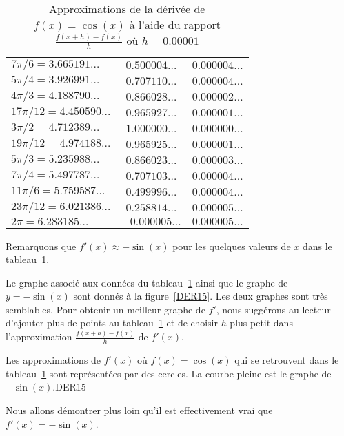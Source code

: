 {\begin{table}
{\begin{center}
\begin{tabular}{l|c|c}
$7\pi/6 = 3.665191\ldots$ & $0.500004\ldots$ & $0.000004\ldots$ \\ 
$5\pi/4 = 3.926991\ldots$ & $0.707110\ldots$ & $0.000004\ldots$ \\ 
$4\pi/3 = 4.188790\ldots$ & $0.866028\ldots$ & $0.000002\ldots$ \\ 
$17\pi/12 = 4.450590\ldots$ & $0.965927\ldots$ & $0.000001\ldots$ \\ 
$3\pi/2 = 4.712389\ldots$ & $1.000000\ldots$ & $0.000000\ldots$ \\ 
$19\pi/12 = 4.974188\ldots$ & $0.965925\ldots$ & $0.000001\ldots$ \\ 
$5\pi/3 = 5.235988\ldots$ & $0.866023\ldots$ & $0.000003\ldots$ \\ 
$7\pi/4 = 5.497787\ldots$ & $0.707103\ldots$ & $0.000004\ldots$ \\ 
$11\pi/6 = 5.759587\ldots$ & $0.499996\ldots$ & $0.000004\ldots$ \\ 
$23\pi/12 = 6.021386\ldots$ & $0.258814\ldots$ & $0.000005\ldots$ \\ 
$2\pi = 6.283185\ldots$ & $-0.000005\ldots$ & $0.000005\ldots$ \\ 
\cline{1-3}
\end{tabular}
\end{center}
}
\caption[Approximations de la dérivée de $f(x) = \cos(x)$ à partir de
la définition de la dérivées.]{Approximations de la dérivée de $f(x) =
\cos(x)$ \`a l'aide du rapport $\displaystyle \frac{f(x+h)-f(x)}{h}$
où $h = 0.00001$ \label{TAB_COS_P}}
\end{table}

Remarquons que $f'(x) \approx -\sin(x)$ pour les quelques valeurs de $x$
dans le tableau~\ref{TAB_COS_P}.

Le graphe associé aux données du tableau~\ref{TAB_COS_P} ainsi que le
graphe de $y=-\sin(x)$ sont donnés à la figure~\ref{DER15}.  Les deux
graphes sont très semblables.  Pour obtenir un meilleur graphe de $f'$,
nous suggérons au lecteur d'ajouter plus de points au
tableau~\ref{TAB_COS_P} et de choisir $h$ plus petit dans
l'approximation $\displaystyle \frac{f(x+h)-f(x)}{h}$ de $f'(x)$.

{Les approximations de $f'(x)$ où $f(x)=\cos(x)$ qui se retrouvent
dans le tableau~\ref{TAB_COS_P} sont représentées par des cercles.  La
courbe pleine est le graphe de $-\sin(x)$.}{DER15}

Nous allons démontrer plus loin qu'il est effectivement vrai que
$\displaystyle f'(x) = -\sin(x)$.

}
